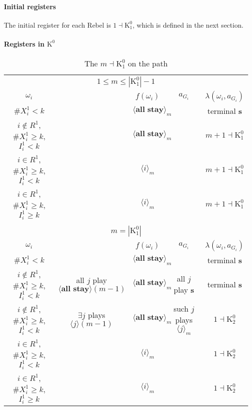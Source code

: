 \documentclass[12pt,letter]{article}
\newcommand{\Kappa}{\mathrm{K}}
\theoremstyle{definition}
\theoremstyle{remark}
\theoremstyle{claim}
\begin{document}
\paragraph{Initial registers}
The initial register for each Rebel is $1\dashv\Kappa^0_1$, which is defined in the next section.
\paragraph{Registers in $\Kappa^0$}

\begin{landscape}
\begin{table}[!htbp]
\caption{The $m\dashv\Kappa^0_{1}$ on the path}
\label{table:eqm_path_k01}
\begin{center}
\begin{tabular}{c c | c | c | c }
\multicolumn{5}{c}{$1\leq m \leq |\Kappa^0_1|-1$}\\
$\omega_i$ 	 & 	   &	$f(\omega_i)$  &	$a_{G_i}$ & $\lambda(\omega_i,a_{G_i})$ \\
\hline
\hline
$\# X^1_i<k$  	& 	 &$\langle \textbf{all stay} \rangle_m$ &	& terminal \textbf{s}\\
$i\notin R^1$, $\# X^1_i\geq k$, $I^1_i< k$  	&  &$\langle \textbf{all stay} \rangle_m$ & 	& $m+1\dashv\Kappa^0_{1}$\\
$i\in R^1$, $\# X^1_i\geq k$, $I^1_i< k$  	& 	 &$\langle i \rangle_m$	&  & $m+1\dashv \Kappa^0_{1}$\\
$i\in R^1$, $\# X^1_i\geq k$, $I^1_i\geq k$  	& 	 &$\langle i \rangle_m$	&  & $m+1\dashv \Kappa^0_{1}$\\
\hline
\\
\multicolumn{5}{c}{$m=|\Kappa^0_1|$}\\
$\omega_i$ 	 & 	   &	$f(\omega_i)$  &	$a_{G_i}$ & $\lambda(\omega_i,a_{G_i})$ \\
\hline
\hline
$\# X^1_i<k$  	& 	& $\langle \textbf{all stay} \rangle_m$	&     & terminal \textbf{s}\\
$i\notin R^1$, $\# X^1_i\geq k$, $I^1_i< k$   	& all $j$ play $\langle \textbf{all stay} \rangle(m-1)$ & $\langle \textbf{all stay} \rangle_m$	 & all $j$ play \textbf{s} & terminal \textbf{s}\\
$i\notin R^1$, $\# X^1_i\geq k$, $I^1_i< k$   	& $\exists j$ plays $\langle j \rangle(m-1)$ & $\langle \textbf{all stay} \rangle_m$	& such $j$ plays $\langle j \rangle_m$  & $1\dashv \Kappa^0_2$\\
$i\in R^1$, $\# X^1_i\geq k$, $I^1_i< k$   	& 	& $\langle i \rangle_m$	&& $1\dashv \Kappa^0_2$ \\
$i\in R^1$, $\# X^1_i\geq k$, $I^1_i\geq k$  	& 	& $\langle i \rangle_m$ &	& $1\dashv \Kappa^0_2$ \\
\hline
\end{tabular}
\end{center}
\end{table}



\end{landscape}
\end{document}
